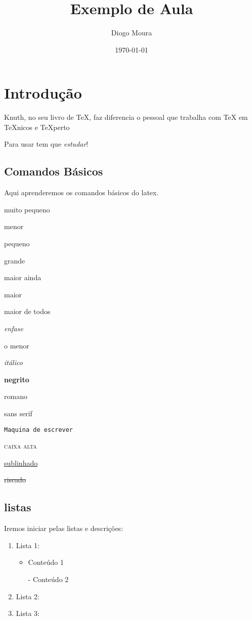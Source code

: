 \documentclass{article}
\title{Exemplo de Aula}
\author{Diogo Moura}
\date{\today}
\begin{document}
\maketitle
\section{Introdução}
Knuth, no seu livro de \TeX{},
faz diferencia o pessoal
que trabalha com \TeX{} em
\TeX{}nicos e \TeX perto

Para usar tem que \textsl{estudar}!
\subsection{Comandos Básicos}
Aqui aprenderemos os comandos básicos do latex.



{\scriptsize muito pequeno}

{\footnotesize menor}

{\small pequeno}

{\large grande}

{\LARGE maior ainda}

{\huge maior}

{\Huge maior de todos}

\emph{enfase}

  
{\tiny o menor}

\textit{itálico}

\textbf{negrito}

\textrm{romano}

\textsf{sans serif}

\texttt{Maquina de escrever}

\textsc{caixa alta}

\uline{sublinhado}



\sout{riscado}


\flushleft{}
\subsection{listas}

Iremos iniciar pelas listas e descrições:
\begin{enumerate}
  \item Lista 1:
  \begin{itemize}
    \item Conteúdo 1
    \item[-] Conteúdo 2
  \end{itemize}
  \item Lista 2:
  \item Lista 3:
\end{enumerate}
\end{document}
